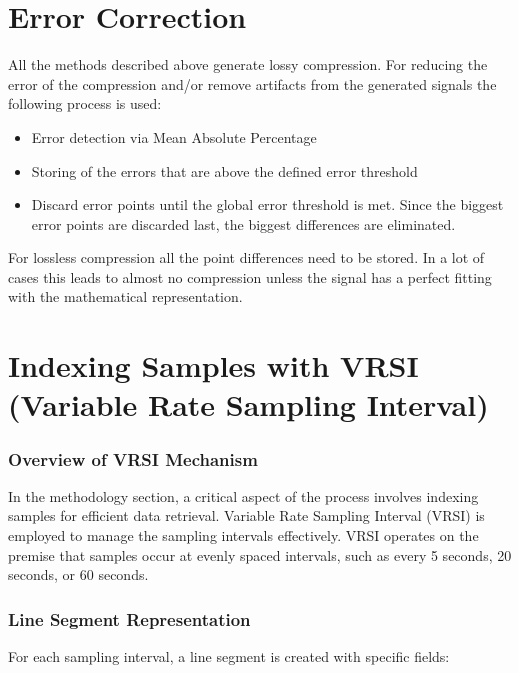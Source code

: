 \documentclass[conference]{IEEEtran}
\begin{document}
\vspace{10pt}
\section{Error Correction}

All the methods described above generate lossy compression. 
For reducing the error of the compression and/or remove artifacts from the generated signals the following process is used:

\begin{itemize}
    \item Error detection via Mean Absolute Percentage
    \item Storing of the errors that are above the defined error threshold
    \item Discard error points until the global error threshold is met. Since the biggest error points are discarded last, the biggest differences are eliminated.
\end{itemize}

For lossless compression all the point differences need to be stored. In a lot of cases this leads to almost no compression unless the signal has a perfect fitting with
the mathematical representation.

\section{Indexing Samples with VRSI (Variable Rate Sampling Interval)}
\vspace{5pt}
\subsubsection{Overview of VRSI Mechanism}

In the methodology section, a critical aspect of the process involves indexing samples for efficient data retrieval. Variable Rate Sampling Interval (VRSI) is employed to manage the sampling intervals effectively. VRSI operates on the premise that samples occur at evenly spaced intervals, such as every 5 seconds, 20 seconds, or 60 seconds.
\vspace{5pt}
\subsubsection{Line Segment Representation}

For each sampling interval, a line segment is created with specific fields:
\end{document}
